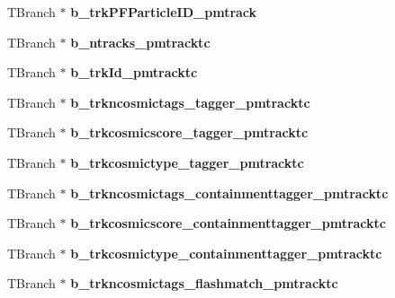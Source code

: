 \begin{DoxyCompactItemize}
\item 
\hypertarget{classanatree_a005ca19c48ded398b5954cdb22a51fd5}{T\-Branch $\ast$ {\bfseries b\-\_\-trk\-P\-F\-Particle\-I\-D\-\_\-pmtrack}}\label{classanatree_a005ca19c48ded398b5954cdb22a51fd5}

\item 
\hypertarget{classanatree_a8eca92e362ccabbecdeeb378893b3454}{T\-Branch $\ast$ {\bfseries b\-\_\-ntracks\-\_\-pmtracktc}}\label{classanatree_a8eca92e362ccabbecdeeb378893b3454}

\item 
\hypertarget{classanatree_a57123eac106f498e4e9e38460b8417d9}{T\-Branch $\ast$ {\bfseries b\-\_\-trk\-Id\-\_\-pmtracktc}}\label{classanatree_a57123eac106f498e4e9e38460b8417d9}

\item 
\hypertarget{classanatree_ae4722fdeec62aee3d07a17e9f16aa256}{T\-Branch $\ast$ {\bfseries b\-\_\-trkncosmictags\-\_\-tagger\-\_\-pmtracktc}}\label{classanatree_ae4722fdeec62aee3d07a17e9f16aa256}

\item 
\hypertarget{classanatree_ab39e90eb53f753449c0e792f647889e8}{T\-Branch $\ast$ {\bfseries b\-\_\-trkcosmicscore\-\_\-tagger\-\_\-pmtracktc}}\label{classanatree_ab39e90eb53f753449c0e792f647889e8}

\item 
\hypertarget{classanatree_a59d1660a9033d63bb26c5678f8520463}{T\-Branch $\ast$ {\bfseries b\-\_\-trkcosmictype\-\_\-tagger\-\_\-pmtracktc}}\label{classanatree_a59d1660a9033d63bb26c5678f8520463}

\item 
\hypertarget{classanatree_a2db1a9487f1fc49cd291523a7a4253d8}{T\-Branch $\ast$ {\bfseries b\-\_\-trkncosmictags\-\_\-containmenttagger\-\_\-pmtracktc}}\label{classanatree_a2db1a9487f1fc49cd291523a7a4253d8}

\item 
\hypertarget{classanatree_ac3973da95c7700d038d03e167f5b3a45}{T\-Branch $\ast$ {\bfseries b\-\_\-trkcosmicscore\-\_\-containmenttagger\-\_\-pmtracktc}}\label{classanatree_ac3973da95c7700d038d03e167f5b3a45}

\item 
\hypertarget{classanatree_aecfd7b8915425dfa69326efbe4a71037}{T\-Branch $\ast$ {\bfseries b\-\_\-trkcosmictype\-\_\-containmenttagger\-\_\-pmtracktc}}\label{classanatree_aecfd7b8915425dfa69326efbe4a71037}

\item 
\hypertarget{classanatree_afd86722fb60b2457a725531f6ffb7d3e}{T\-Branch $\ast$ {\bfseries b\-\_\-trkncosmictags\-\_\-flashmatch\-\_\-pmtracktc}}\label{classanatree_afd86722fb60b2457a725531f6ffb7d3e}


\end{DoxyCompactItemize}
